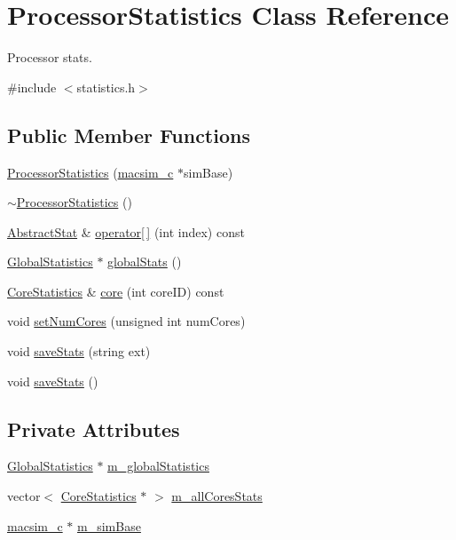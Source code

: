 \hypertarget{classProcessorStatistics}{
\section{ProcessorStatistics Class Reference}
\label{classProcessorStatistics}
}


Processor stats.  




{\ttfamily \#include $<$statistics.h$>$}

\subsection*{Public Member Functions}
\begin{DoxyCompactItemize}
\item 
\hyperlink{classProcessorStatistics_acf0a2d564c3b50334754eb662a7dc7b0}{ProcessorStatistics} (\hyperlink{classmacsim__c}{macsim\_\-c} $\ast$simBase)
\item 
\hyperlink{classProcessorStatistics_a2e01ba62eb79918cc07f5838cb86dff9}{$\sim$ProcessorStatistics} ()
\item 
\hyperlink{classAbstractStat}{AbstractStat} \& \hyperlink{classProcessorStatistics_a7f4f1fa10e0beb9c77fb7384219f375d}{operator\mbox{[}$\,$\mbox{]}} (int index) const 
\item 
\hyperlink{classGlobalStatistics}{GlobalStatistics} $\ast$ \hyperlink{classProcessorStatistics_aa42b94a6f234a4fdf3feb5773e1b3e87}{globalStats} ()
\item 
\hyperlink{classCoreStatistics}{CoreStatistics} \& \hyperlink{classProcessorStatistics_ae5e3d2655a7b9615177926d8388ca198}{core} (int coreID) const 
\item 
void \hyperlink{classProcessorStatistics_ae33aae10a216b093b8cb42de68b1e52b}{setNumCores} (unsigned int numCores)
\item 
void \hyperlink{classProcessorStatistics_a7dfc9a0065fdb10897ae90cdc5dcec73}{saveStats} (string ext)
\item 
void \hyperlink{classProcessorStatistics_adcc54aa1c9ff753d7e1d52698399a92c}{saveStats} ()
\end{DoxyCompactItemize}
\subsection*{Private Attributes}
\begin{DoxyCompactItemize}
\item 
\hyperlink{classGlobalStatistics}{GlobalStatistics} $\ast$ \hyperlink{classProcessorStatistics_ab7c416dfed4f35806c7c0ab940eb13e3}{m\_\-globalStatistics}
\item 
vector$<$ \hyperlink{classCoreStatistics}{CoreStatistics} $\ast$ $>$ \hyperlink{classProcessorStatistics_aebf8d458721e8dae44eb6553f63e8bd3}{m\_\-allCoresStats}
\item 
\hyperlink{classmacsim__c}{macsim\_\-c} $\ast$ \hyperlink{classProcessorStatistics_a8578cc09c367d3be975d814322d97f5b}{m\_\-simBase}
\end{DoxyCompactItemize}


